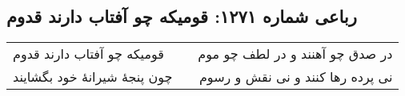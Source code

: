 \begin{center}
\section*{رباعی شماره ۱۲۷۱: قومیکه چو آفتاب دارند قدوم}
\label{sec:1271}
\begin{longtable}{l p{0.5cm} r}
قومیکه چو آفتاب دارند قدوم
&&
در صدق چو آهنند و در لطف چو موم
\\
چون پنجهٔ شیرانهٔ خود بگشایند
&&
نی پرده رها کنند و نی نقش و رسوم
\\
\end{longtable}
\end{center}

